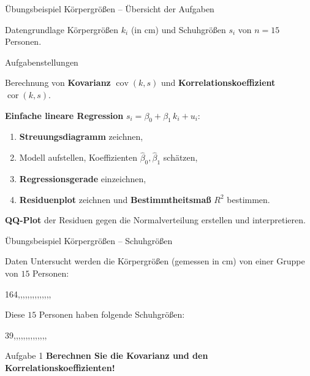 \documentclass[aspectratio=169,11pt]{beamer}
\begin{document}
\begin{frame}{Übungsbeispiel Körpergrößen -- Übersicht der Aufgaben}
  \begin{block}{Datengrundlage}
    Körpergrößen $k_i$ (in cm) und Schuhgrößen $s_i$ von
    $n = 15$ Personen.
  \end{block}

  \begin{exampleblock}{Aufgabenstellungen}
    \begin{description}
      \setlength{\itemsep}{0.3em}
      \item[Aufgabe 1] Berechnung von \textbf{Kovarianz}
            $\operatorname{cov}(k,s)$ und \textbf{Korrelations\-koeffizient}
            $\operatorname{cor}(k,s)$.
      \item[Aufgabe 2] \textbf{Einfache lineare Regression}
            $s_i = \beta_0 + \beta_1\, k_i + u_i$:
        \begin{enumerate}\itemsep0pt
          \item \textbf{Streuungsdiagramm} zeichnen,
          \item Modell aufstellen, Koeffizienten
                $\hat{\beta}_0,\hat{\beta}_1$ schätzen,
          \item \textbf{Regressionsgerade} einzeichnen,
          \item \textbf{Residuenplot} zeichnen und
                \textbf{Bestimmtheitsmaß} $R^{2}$ bestimmen.
        \end{enumerate}
      \item[Aufgabe 3] \textbf{QQ-Plot} der Residuen gegen die
            Normalverteilung erstellen und interpretieren.
    \end{description}
  \end{exampleblock}
\end{frame}

\begin{frame}{Übungsbeispiel Körpergrößen -- Schuhgrößen}
  \begin{block}{Daten}
    Untersucht werden die Körpergrößen (gemessen in cm) von einer
    Gruppe von $15$ Personen:
    \begin{center}
      164,,,,,,,,,,,,,,
    \end{center}
    Diese $15$ Personen haben folgende Schuhgrößen:
    \begin{center}
      39,,,,,,,,,,,,,,
    \end{center}
  \end{block}

  \begin{exampleblock}{Aufgabe 1}
    \textbf{Berechnen Sie die Kovarianz und den
    Korrelationskoeffizienten!}
  \end{exampleblock}
\end{frame}
\end{document}
